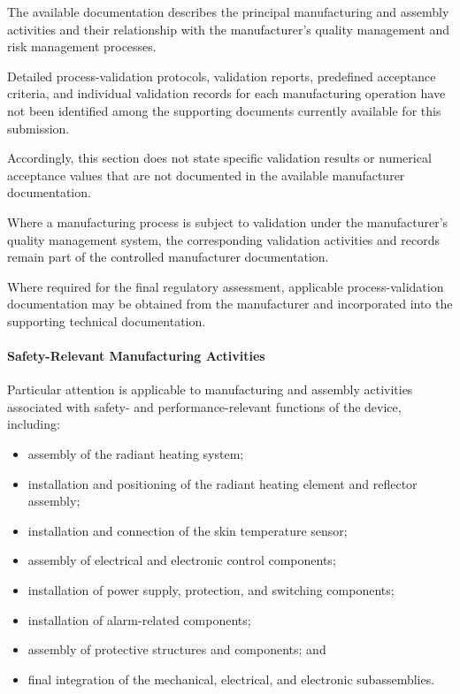 The available documentation describes the principal manufacturing
and assembly activities and their relationship with the
manufacturer's quality management and risk management processes.

Detailed process-validation protocols, validation reports,
predefined acceptance criteria, and individual validation records
for each manufacturing operation have not been identified among the
supporting documents currently available for this submission.

Accordingly, this section does not state specific validation results
or numerical acceptance values that are not documented in the
available manufacturer documentation.

Where a manufacturing process is subject to validation under the
manufacturer's quality management system, the corresponding
validation activities and records remain part of the controlled
manufacturer documentation.

Where required for the final regulatory assessment, applicable
process-validation documentation may be obtained from the
manufacturer and incorporated into the supporting technical
documentation.

\paragraph{Safety-Relevant Manufacturing Activities}

Particular attention is applicable to manufacturing and assembly
activities associated with safety- and performance-relevant functions
of the device, including:

\begin{itemize}
    \item assembly of the radiant heating system;
    \item installation and positioning of the radiant heating element
    and reflector assembly;
    \item installation and connection of the skin temperature sensor;
    \item assembly of electrical and electronic control components;
    \item installation of power supply, protection, and switching
    components;
    \item installation of alarm-related components;
    \item assembly of protective structures and components; and
    \item final integration of the mechanical, electrical, and
    electronic subassemblies.
\end{itemize}

